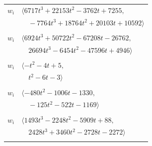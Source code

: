 \documentclass[11pt]{article}
\begin{document}
\begin{longtable}{@{}ll@{}}
$w_i$ & $\langle 6717t^{3}+22153t^{2}-3762t+7255,$\\
 & $\quad -7764t^{3}+18764t^{2}+20103t+10592\rangle$\\
\addlinespace[2pt]
\multicolumn{2}{@{}p{0.97\textwidth}@{}}{$i=11$, $D_i=1$, $\rho_{ij}$: $13{:}1, \allowbreak 15{:}1, \allowbreak 18{:}2, \allowbreak 19{:}1, \allowbreak 21{:}2, \allowbreak 22{:}2, \allowbreak 25{:}1, \allowbreak 26{:}1, \allowbreak 32{:}2, \allowbreak 39{:}2, \allowbreak 45{:}1, \allowbreak 59{:}1, \allowbreak 60{:}1, \allowbreak 61{:}2, \allowbreak 62{:}2, \allowbreak 63{:}1, \allowbreak 65{:}2, \allowbreak 72{:}1, \allowbreak 74{:}2, \allowbreak 95{:}1, \allowbreak 97{:}2$}\\
$w_i$ & $\langle 6924t^{3}+50722t^{2}-67208t-26762,$\\
 & $\quad 26694t^{3}-6454t^{2}-47596t+4946\rangle$\\
\addlinespace[2pt]
\multicolumn{2}{@{}p{0.97\textwidth}@{}}{$i=12$, $D_i=1$, $\rho_{ij}$: $0{:}2, \allowbreak 13{:}2, \allowbreak 20{:}1, \allowbreak 24{:}2, \allowbreak 33{:}2, \allowbreak 36{:}2, \allowbreak 37{:}2, \allowbreak 40{:}1, \allowbreak 42{:}1$}\\
$w_i$ & $\langle -t^{2}-4t+5,$\\
 & $\quad t^{2}-6t-3\rangle$\\
\addlinespace[2pt]
\multicolumn{2}{@{}p{0.97\textwidth}@{}}{$i=13$, $D_i=1$, $\rho_{ij}$: $8{:}2, \allowbreak 9{:}1, \allowbreak 10{:}2, \allowbreak 11{:}2, \allowbreak 12{:}1, \allowbreak 16{:}1, \allowbreak 22{:}1, \allowbreak 34{:}1, \allowbreak 40{:}2, \allowbreak 47{:}2, \allowbreak 53{:}2, \allowbreak 55{:}1, \allowbreak 56{:}2, \allowbreak 59{:}2, \allowbreak 60{:}1, \allowbreak 64{:}1$}\\
$w_i$ & $\langle -480t^{2}-1006t-1330,$\\
 & $\quad -125t^{2}-522t-1169\rangle$\\
\addlinespace[2pt]
\multicolumn{2}{@{}p{0.97\textwidth}@{}}{$i=14$, $D_i=1$, $\rho_{ij}$: $0{:}1, \allowbreak 1{:}1, \allowbreak 9{:}2, \allowbreak 16{:}2, \allowbreak 19{:}1, \allowbreak 21{:}1, \allowbreak 27{:}1, \allowbreak 32{:}1, \allowbreak 55{:}2, \allowbreak 59{:}1, \allowbreak 60{:}1, \allowbreak 61{:}1, \allowbreak 63{:}1$}\\
$w_i$ & $\langle 1493t^{3}-2248t^{2}-5909t+88,$\\
 & $\quad 2428t^{3}+3460t^{2}-2728t-2272\rangle$\\
\addlinespace[2pt]
\multicolumn{2}{@{}p{0.97\textwidth}@{}}{$i=15$, $D_i=1$, $\rho_{ij}$: $0{:}2, \allowbreak 11{:}2, \allowbreak 17{:}2, \allowbreak 22{:}2, \allowbreak 27{:}1, \allowbreak 33{:}2, \allowbreak 34{:}1, \allowbreak 37{:}2, \allowbreak 41{:}1, \allowbreak 42{:}1, \allowbreak 45{:}2, \allowbreak 55{:}2, \allowbreak 59{:}1, \allowbreak 61{:}1$}\\

\end{longtable}
\end{document}
